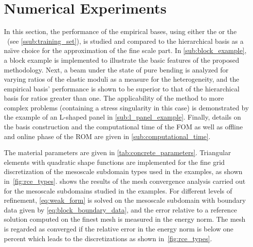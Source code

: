 \documentclass[AMA,STIX1COL,doublespace]{WileyNJD-v2}
\begin{document}
\section{Numerical Experiments}%
\label{sec:numerical_experiments}
In this section, the performance of the empirical bases, using either the  or the ~(see \cref{ssub:training_set}), is studied and compared to the hierarchical basis as a na\"{\i}ve choice for the approximation of the fine scale part.
In \cref{sub:block_example}, a block example is implemented to illustrate the basic features of the proposed methodology.
Next, a beam under the state of pure bending is analyzed for varying ratios of the elastic moduli as a measure for the heterogeneity, and the empirical basis' performance is shown to be superior to that of the hierarchical basis for ratios greater than one.
The applicability of the method to more complex problems (containing a stress singularity in this case) is demonstrated by the example of an L-shaped panel in \cref{sub:l_panel_example}.
Finally, details on the basis construction and the computational time of the FOM as well as offline and online phase of the ROM are given in \cref{sub:computational_time}.

The material parameters are given in \cref{tab:concrete_parameters}.
Triangular elements with quadratic shape functions are implemented for the fine grid discretization of the mesoscale subdomain types used in the examples, as shown in~\cref{fig:rce_types}.
 shows the results of the mesh convergence analysis
carried out for the mesoscale subdomains studied in the examples.
For different levels of refinement, \cref{eq:weak_form} is solved on the mesoscale subdomain with boundary data given by \cref{eq:block_boundary_data}, and the error relative to a reference solution computed on the finest mesh is measured in the energy norm.
The mesh is regarded as converged if the relative error in the energy norm is below one percent which leads to the discretizations as shown in~\cref{fig:rce_types}.
\end{document}
